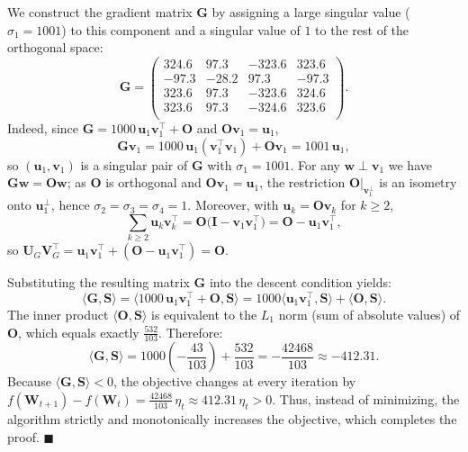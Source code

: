 \documentclass{article}
\begin{document}
We construct the gradient matrix $\mathbf{G}$ by assigning a large singular value ($\sigma_1 = 1001$) to this component and a singular value of $1$ to the rest of the orthogonal space:
\begin{equation}
    \mathbf{G} = \begin{pmatrix}
        324.6 & 97.3 & -323.6 & 323.6 \\
        -97.3 & -28.2 & 97.3 & -97.3 \\
        323.6 & 97.3 & -323.6 & 324.6 \\
        323.6 & 97.3 & -324.6 & 323.6 \\
      \end{pmatrix}.
\end{equation}
Indeed, since $\mathbf{G}=1000\,\mathbf{u}_1\mathbf{v}_1^\top+\mathbf{O}$ and $\mathbf{O}\mathbf{v}_1=\mathbf{u}_1$,
\[
\mathbf{G}\mathbf{v}_1 = 1000\,\mathbf{u}_1(\mathbf{v}_1^\top\mathbf{v}_1)+\mathbf{O}\mathbf{v}_1 = 1001\,\mathbf{u}_1,
\]
so $(\mathbf{u}_1,\mathbf{v}_1)$ is a singular pair of $\mathbf{G}$ with $\sigma_1=1001$. For any $\mathbf{w}\perp\mathbf{v}_1$ we have
$\mathbf{G}\mathbf{w}=\mathbf{O}\mathbf{w}$; as $\mathbf{O}$ is orthogonal and $\mathbf{O}\mathbf{v}_1=\mathbf{u}_1$, the restriction
$\mathbf{O}|_{\mathbf{v}_1^\perp}$ is an isometry onto $\mathbf{u}_1^\perp$, hence $\sigma_2=\sigma_3=\sigma_4=1$. Moreover, with
$\mathbf{u}_k=\mathbf{O}\mathbf{v}_k$ for $k\ge2$,
\[
\textstyle\sum_{k\ge2}\mathbf{u}_k\mathbf{v}_k^\top=\mathbf{O}\bigl(\mathbf{I}-\mathbf{v}_1\mathbf{v}_1^\top\bigr)=\mathbf{O}-\mathbf{u}_1\mathbf{v}_1^\top,  
\]
so $\mathbf{U}_G\mathbf{V}_G^\top=\mathbf{u}_1\mathbf{v}_1^\top+(\mathbf{O}-\mathbf{u}_1\mathbf{v}_1^\top)=\mathbf{O}$.

Substituting the resulting matrix $\mathbf{G}$ into the descent condition yields:
\begin{equation}
\langle \mathbf{G}, \mathbf{S} \rangle = \langle 1000 \, \mathbf{u}_1 \mathbf{v}_1^\top + \mathbf{O}, \mathbf{S} \rangle = 1000 \langle \mathbf{u}_1 \mathbf{v}_1^\top, \mathbf{S} \rangle + \langle \mathbf{O}, \mathbf{S} \rangle.
\end{equation}
The inner product $\langle \mathbf{O}, \mathbf{S} \rangle$ is equivalent to the $L_1$ norm (sum of absolute values) of $\mathbf{O}$, which equals exactly $\frac{532}{103}$. Therefore:
\begin{equation}
\langle \mathbf{G}, \mathbf{S} \rangle = 1000 \left(-\frac{43}{103}\right) + \frac{532}{103} = -\frac{42468}{103} \approx -412.31.
\end{equation}
Because $\langle \mathbf{G}, \mathbf{S} \rangle < 0$, the objective changes at every iteration by $f(\mathbf{W}_{t+1}) - f(\mathbf{W}_t) = \tfrac{42468}{103}\,\eta_t \approx 412.31\,\eta_t > 0$. Thus, instead of minimizing, the algorithm strictly and monotonically increases the objective, which completes the proof. $\blacksquare$
\end{document}
